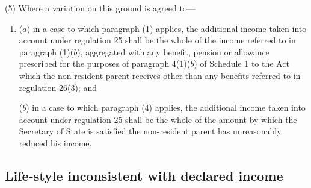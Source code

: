 \documentclass[12pt,a4paper]{article}
\begin{document}
(5) Where a variation on this ground is agreed to—
\begin{enumerate}\item[]
($a$) in a case to which paragraph (1) applies, the additional income taken into account under regulation 25 shall be the whole of the income referred to in paragraph (1)($b$), aggregated with any benefit, pension or allowance 
prescribed for the purposes of paragraph 4(1)($b$)  of Schedule 1 to the Act  %
which the non-resident parent receives other than any benefits referred to in regulation 26(3); and

($b$) in a case to which paragraph (4) applies, the additional income taken into account under regulation 25 shall be the whole of the amount by which the Secretary of State is satisfied the non-resident parent has unreasonably reduced his income.
\end{enumerate}


\subsection[20. Life-style inconsistent with declared income]{Life-style inconsistent with declared income}
\end{document}
